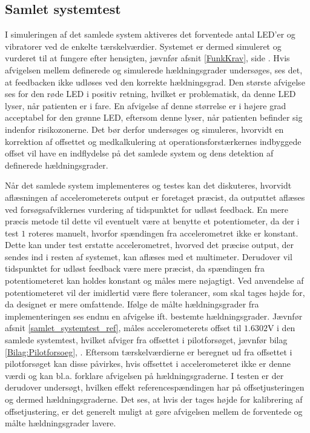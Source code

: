 \subsection{Samlet systemtest}
I simuleringen af det samlede system aktiveres det forventede antal LED'er og vibratorer ved de enkelte tærskelværdier. Systemet er dermed simuleret og vurderet til at fungere efter hensigten, jævnfør afsnit \ref{FunkKrav}, side \pageref{FunkKrav}. Hvis afvigelsen mellem definerede og simulerede hældningsgrader undersøges, ses det, at feedbacken ikke udløses ved den korrekte hældningsgrad. Den største afvigelse ses for den røde LED i positiv retning, hvilket er problematisk, da denne LED lyser, når patienten er i fare. En afvigelse af denne størrelse er i højere grad acceptabel for den grønne LED, eftersom denne lyser, når patienten befinder sig indenfor risikozonerne. Det bør derfor undersøges og simuleres, hvorvidt en korrektion af offsettet og medkalkulering at operationsforstærkernes indbyggede offset vil have en indflydelse på det samlede system og dens detektion af definerede hældningsgrader. 

Når det samlede system implementeres og testes kan det diskuteres, hvorvidt aflæsningen af accelerometerets output er foretaget præcist, da outputtet aflæses ved forsøgsafviklernes vurdering af tidspunktet for udløst feedback. En mere præcis metode til dette vil eventuelt være at benytte et potentiometer, da der i test $1$ roteres manuelt, hvorfor spændingen fra accelerometret ikke er konstant. Dette kan under test erstatte accelerometret, hvorved det præcise output, der sendes ind i resten af systemet, kan aflæses med et multimeter. Derudover vil tidspunktet for udløst feedback være mere præcist, da spændingen fra potentiometeret kan holdes konstant og måles mere nøjagtigt. Ved anvendelse af potentiometeret vil der imidlertid være flere tolerancer, som skal tages højde for, da designet er mere omfattende. Ifølge de målte hældningsgrader fra implementeringen ses endnu en afvigelse ift. bestemte hældningsgrader. Jævnfør afsnit \ref{samlet_systemtest_ref}, \pageref{samlet_systemtest_ref} måles accelerometerets offset til $1.6302$V i den samlede systemtest, hvilket afviger fra offsettet i pilotforsøget, jævnfør bilag \ref{Bilag:Pilotforsoeg}, \pageref{Bilag:Pilotforsoeg}. Eftersom tærskelværdierne er beregnet ud fra offsettet i pilotforsøget kan disse påvirkes, hvis offsettet i accelerometeret ikke er denne værdi og kan bl.a. forklare afvigelsen på hældningsgraderne. %
I testen er der derudover undersøgt, hvilken effekt referencespændingen har på offsetjusteringen og dermed hældningsgraderne. Det ses, at hvis der tages højde for kalibrering af offsetjustering, er det generelt muligt at gøre afvigelsen mellem de forventede og målte hældningsgrader lavere. 

